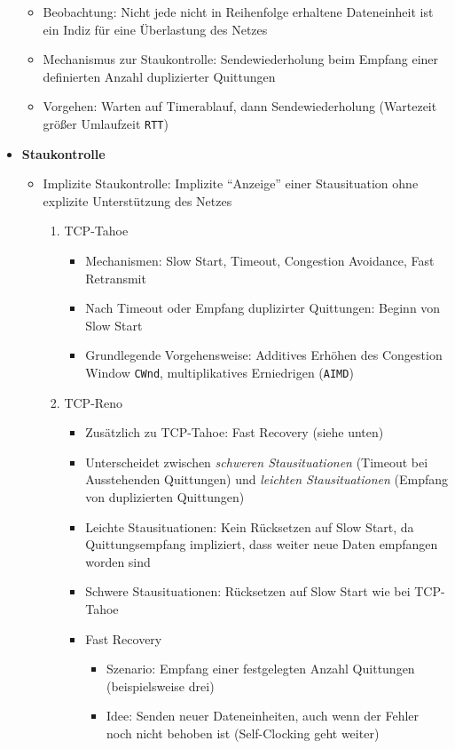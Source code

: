 \begin{itemize}
	\begin{itemize}
		\item Beobachtung: Nicht jede nicht in Reihenfolge erhaltene Dateneinheit ist ein Indiz für eine Überlastung des Netzes
		\item Mechanismus zur Staukontrolle: Sendewiederholung beim Empfang einer definierten Anzahl duplizierter Quittungen
		\item Vorgehen: Warten auf Timerablauf, dann Sendewiederholung (Wartezeit größer Umlaufzeit \texttt{RTT})
	\end{itemize}
	\item \textbf{Staukontrolle}
	\begin{itemize}
		\item Implizite Staukontrolle: Implizite "`Anzeige"' einer Stausituation ohne explizite Unterstützung des Netzes
		\begin{enumerate}
			\item TCP-Tahoe
			\begin{itemize}
				\item Mechanismen: Slow Start, Timeout, Congestion Avoidance, Fast Retransmit
				\item Nach Timeout oder Empfang duplizirter Quittungen: Beginn von Slow Start
				\item Grundlegende Vorgehensweise: Additives Erhöhen des Congestion Window \texttt{CWnd}, multiplikatives Erniedrigen (\texttt{AIMD})
			\end{itemize}
			\item TCP-Reno
			\begin{itemize}
				\item Zusätzlich zu TCP-Tahoe: Fast Recovery (siehe unten)
				\item Unterscheidet zwischen \textit{schweren Stausituationen} (Timeout bei Ausstehenden Quittungen) und \textit{leichten Stausituationen} (Empfang von duplizierten Quittungen)
				\item Leichte Stausituationen: Kein Rücksetzen auf Slow Start, da Quittungsempfang impliziert, dass weiter neue Daten empfangen worden sind
				\item Schwere Stausituationen: Rücksetzen auf Slow Start wie bei TCP-Tahoe
				\item Fast Recovery
				\begin{itemize}
					\item Szenario: Empfang einer festgelegten Anzahl Quittungen (beispielsweise drei)
					\item Idee: Senden neuer Dateneinheiten, auch wenn der Fehler noch nicht behoben ist (Self-Clocking geht weiter)

\end{itemize}
\end{itemize}
\end{enumerate}
\end{itemize}
\end{itemize}
